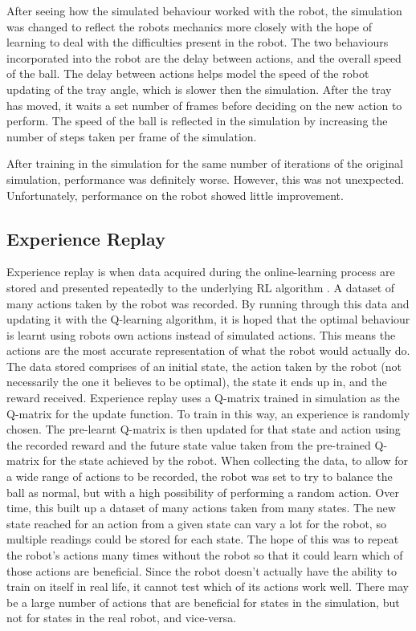 \documentclass[12pt,a4paper]{article}
\begin{document}
After seeing how the simulated behaviour worked with the robot, the simulation was changed to reflect the robots mechanics more closely with the hope of learning to deal with the difficulties present in the robot. The two behaviours incorporated into the robot are the delay between actions, and the overall speed of the ball. The delay between actions helps model the speed of the robot updating of the tray angle, which is slower then the simulation. After the tray has moved, it waits a set number of frames before deciding on the new action to perform. The speed of the ball is reflected in the simulation by increasing the number of steps taken per frame of the simulation. 

After training in the simulation for the same number of iterations of the original simulation, performance was definitely worse. However, this was not unexpected. Unfortunately, performance on the robot showed little improvement. 

\subsection{Experience Replay}
Experience replay is when data acquired during the online-learning process are stored and presented repeatedly to the underlying RL algorithm \cite{er}. A dataset of many actions taken by the robot was recorded. By running through this data and updating it with the Q-learning algorithm, it is hoped that the optimal behaviour is learnt using robots own actions instead of simulated actions. This means the actions are the most accurate representation of what the robot would actually do. The data stored comprises of an initial state, the action taken by the robot (not necessarily the one it believes to be optimal), the state it ends up in, and the reward received. Experience replay uses a Q-matrix trained in simulation as the Q-matrix  for the update function. To train in this way, an experience is randomly chosen. The pre-learnt Q-matrix is then updated for that state and action using the recorded reward and the future state value taken from the pre-trained Q-matrix for the state achieved by the robot. When collecting the data, to allow for a wide range of actions to be recorded, the robot was set to try to balance the ball as normal, but with a high possibility of performing a random action. Over time, this built up a dataset of many actions taken from many states. The new state reached for an action from a given state can vary a lot for the robot, so multiple readings could be stored for each state. The hope of this was to repeat the robot's actions many times without the robot so that it could learn which of those actions are beneficial. Since the robot doesn't actually have the ability to train on itself in real life, it cannot test which of its actions work well. There may be a large number of actions that are beneficial for states in the simulation, but not for states in the real robot, and vice-versa. 
\end{document}
